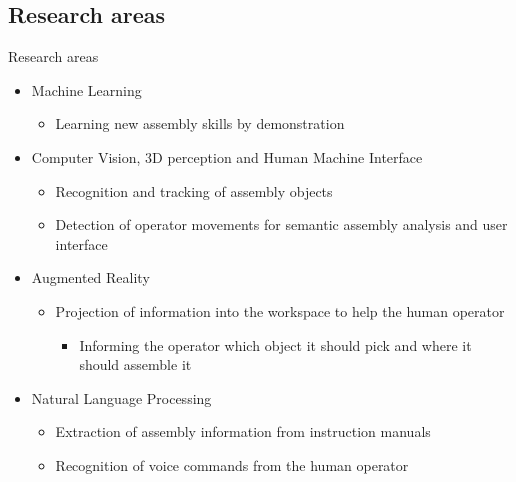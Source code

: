 \subsection{Research areas}
\begin{frame}{Research areas}
	\begin{itemize}
		\item Machine Learning
		\begin{itemize}
			\item Learning new assembly skills by demonstration
		\end{itemize}
		\item Computer Vision, 3D perception and Human Machine Interface
		\begin{itemize}
			\item Recognition and tracking of assembly objects
			\item Detection of operator movements for semantic assembly analysis and user interface
		\end{itemize}
		\item Augmented Reality
		\begin{itemize}
			\item Projection of information into the workspace to help the human operator
			\begin{itemize}
				\item Informing the operator which object it should pick and where it should assemble it
			\end{itemize}
		\end{itemize}
		\item Natural Language Processing
		\begin{itemize}
			\item Extraction of assembly information from instruction manuals
			\item Recognition of voice commands from the human operator
		\end{itemize}
	\end{itemize}
\end{frame}
